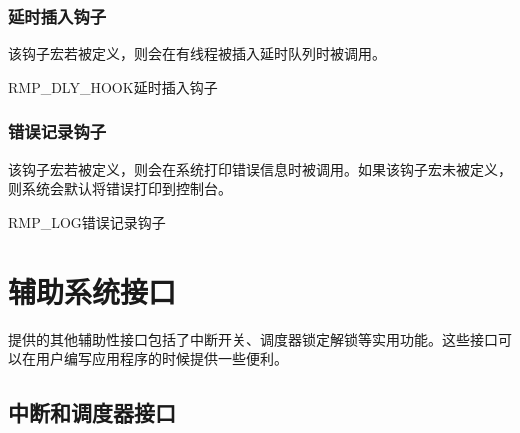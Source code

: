 \subsubsection{延时插入钩子}\label{subsubsec:delay-insertion-hook}

该钩子宏若被定义，则会在有线程被插入延时队列时被调用。

\begin{apidesc}{RMP\_DLY\_HOOK}{延时插入钩子}
    \begin{apiparams}
    \end{apiparams}
    \begin{apiret}
    \end{apiret}
\end{apidesc}

\subsubsection{错误记录钩子}\label{subsubsec:error-logging-hook}

该钩子宏若被定义，则会在系统打印错误信息时被调用。如果该钩子宏未被定义，则系统会默认将错误打印到控制台。

\begin{apidesc}{RMP\_LOG}{错误记录钩子}
    \begin{apiparams}
    \end{apiparams}
    \begin{apiret}
    \end{apiret}
\end{apidesc}

\section{辅助系统接口}\label{sec:auxiliary-system-interface}

\protect{}\label{sec:auxiliary-system-interface-2}提供的其他辅助性接口包括了中断开关、调度器锁定解锁等实用功能。这些接口可以在用户编写应用程序的时候提供一些便利。

\subsection{中断和调度器接口}\label{subsec:interrupt-and-scheduler-interface}

